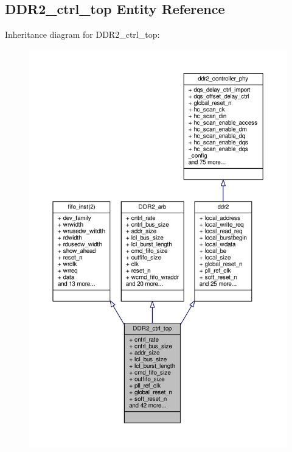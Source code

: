 \subsection{D\+D\+R2\+\_\+ctrl\+\_\+top Entity Reference}
\label{classDDR2__ctrl__top}


Inheritance diagram for D\+D\+R2\+\_\+ctrl\+\_\+top\+:\nopagebreak
\begin{figure}[H]
\begin{center}
\leavevmode
\includegraphics[width=350pt]{d3/dba/classDDR2__ctrl__top__inherit__graph}
\end{center}
\end{figure}


